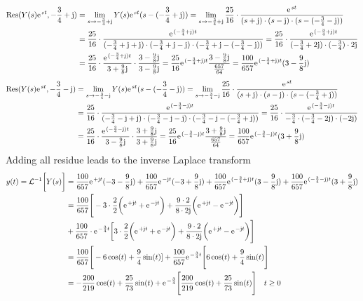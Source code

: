\documentclass[11pt,a4paper,DIV=12]{scrartcl}
\begin{document}
\begin{align}
	\mathrm{Res}(Y(s)\e^{st},-\frac{3}{4}+\im)&=\lim\limits_{s\rightarrow-\frac{3}{4}+\im}Y(s)\e^{st}(s-(-\frac{3}{4}+\im))=\lim\limits_{s \rightarrow -\frac{3}{4}+\im}\frac{25}{16}\cdot\frac{\e^{st}}{(s+\im)\cdot(s-\im)\cdot(s-(-\frac{3}{4}-\im))} \nonumber \\
	&= \frac{25}{16}\cdot\frac{\e^{(-\frac{3}{4}+\im)t}}{(-\frac{3}{4}+\im+\im)\cdot(-\frac{3}{4}+\im-\im)\cdot(-\frac{3}{4}+\im-(-\frac{3}{4}-\im))}=\frac{25}{16}\cdot\frac{\e^{(-\frac{3}{4}+\im)t}}{(-\frac{3}{4}+2\im)\cdot(-\frac{3}{4})\cdot2\im} \nonumber \\
	&=\frac{25}{16}\cdot\frac{\e^{(-\frac{3}{4}+\im)t}}{3+\frac{9}{8}\im}\cdot\frac{3-\frac{9}{8}\im}{3-\frac{9}{8}\im}=\frac{25}{16}\e^{(-\frac{3}{4}+\im)t}\frac{3-\frac{9}{8}\im}{\frac{657}{64}}= \frac{100}{657}\e^{(-\frac{3}{4}+\im)t}(3-\frac{9}{8}\im)
\end{align}
\begin{align}
	\mathrm{Res}(Y(s)\e^{st},-\frac{3}{4}-\im)&=\lim\limits_{s\rightarrow-\frac{3}{4}-\im}Y(s)\e^{st}(s-(-\frac{3}{4}-\im))=\lim\limits_{s \rightarrow -\frac{3}{4}-\im}\frac{25}{16}\cdot\frac{\e^{st}}{(s+\im)\cdot(s-\im)\cdot(s-(-\frac{3}{4}+\im))} \nonumber \\
	&= \frac{25}{16}\cdot\frac{\e^{(-\frac{3}{4}-\im)t}}{(-\frac{3}{4}-\im+\im)\cdot(-\frac{3}{4}-\im-\im)\cdot(-\frac{3}{4}-\im-(-\frac{3}{4}+\im))}=\frac{25}{16}\cdot\frac{\e^{(-\frac{3}{4}-\im)t}}{-\frac{3}{4}\cdot(-\frac{3}{4}-2\im)\cdot(-2\im)} \nonumber \\
	&=\frac{25}{16}\cdot\frac{\e^{(-\frac{3}{4}-\im)t}}{3-\frac{9}{8}\im}\cdot\frac{3+\frac{9}{8}\im}{3+\frac{9}{8}\im}=\frac{25}{16}\e^{(-\frac{3}{4}-\im)t}\frac{3+\frac{9}{8}\im}{\frac{657}{64}}= \frac{100}{657}\e^{(-\frac{3}{4}-\im)t}(3+\frac{9}{8}\im)
\end{align}
Adding all residue leads to the inverse Laplace transform
\begin{align}
	y(t) = \mathcal{L}^{-1}\bigg [Y(s)\bigg ] &= \frac{100}{657}\e^{+\im t}(-3-\frac{9}{8}\im)+\frac{100}{657}\e^{-\im t}(-3+\frac{9}{8}\im)+\frac{100}{657}\e^{(-\frac{3}{4}+\im)t}(3-\frac{9}{8}\im)+\frac{100}{657}\e^{(-\frac{3}{4}-\im)t}(3+\frac{9}{8}\im)\nonumber \\
	&=\frac{100}{657}\Bigg [-3\cdot\frac{2}{2}\bigg (\e^{+\im t}+\e^{-\im t}\bigg )+\frac{9\cdot 2}{8\cdot2\im}\bigg (\e^{+\im t}-\e^{-\im t}\bigg )\Bigg ]\nonumber \\
	&+\frac{100}{657}\cdot\e^{-\frac{3}{4}t}\bigg [3\cdot\frac{2}{2}\bigg (\e^{+\im t}+\e^{-\im t}\bigg )+\frac{9\cdot2}{8\cdot2\im}\bigg (\e^{+\im t}-\e^{-\im t}\bigg )\Bigg ]\nonumber\\
	&=\frac{100}{657}\Bigg [-6\cos(t)+\frac{9}{4}\sin(t)]+\frac{100}{657}\e^{-\frac{3}{4}t}\Bigg [6\cos(t)+\frac{9}{4}\sin(t)\Bigg ] \nonumber \\
	&= -\frac{200}{219}\cos(t)+\frac{25}{73}\sin(t)+\e^{-\frac{3}{4}}\Bigg [\frac{200}{219}\cos(t)+\frac{25}{73}\sin(t) \Bigg ]\quad t \geq 0
\end{align}
\end{document}

